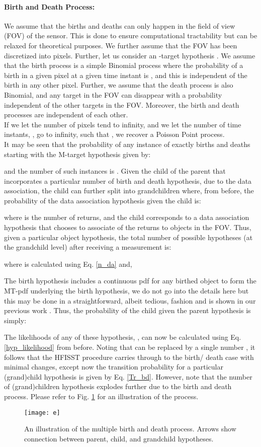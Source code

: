 \documentclass[10pt, conference]{IEEEtran}
\begin{document}
\paragraph{Birth and Death Process:} We assume that the births and deaths can only happen in the field of view (FOV) of the sensor. This is done to ensure computational tractability but can be relaxed for theoretical purposes. We further assume that the FOV has been discretized into  pixels. Further, let us consider an -target hypothesis . We assume that the birth process is a simple Binomial process where the probability of a birth in a given pixel at a given time instant is , and this is independent of the birth in any other pixel. Further, we  assume that the death process is also Binomial, and any target in the FOV can disappear with a probability  independent of the other targets in the FOV. Moreover, the birth and death processes are independent of each other. \\
If we let the number of pixels tend to infinity, and we let the number of time instants, , go to infinity, such that , we recover a Poisson Point process.\\
It may be seen that the probability of any instance of exactly  births and  deaths starting with the M-target hypothesis given by:

and the number of such instances is . Given the child  of the parent  that incorporates a particular number of birth and death hypothesis, due to the data association, the child  can further split into grandchildren  where, from before, the probability of the  data association hypothesis given the  child is:

where  is the number of returns, and the  child corresponds to a data association hypothesis that chooses to associate  of the returns to objects in the FOV. 
Thus, given a particular  object hypothesis, the total number of possible hypotheses (at the grandchild level) after receiving a measurement is:

where  is calculated using Eq. \ref{n_da} and,

The birth hypothesis includes a continuous pdf for any birthed object to form the MT-pdf underlying the birth hypothesis, we do not go into the details here but this may be done in a straightforward, albeit tedious, fashion and is shown in our previous work \cite{Faber1, Faber2}. Thus, the probability of the  child given the parent hypothesis  is simply:

The likelihoods of any of these hypothesis, , can now be calculated using Eq. \ref{hyp_likelihood} from before. Noting that  can be replaced by a single number , it follows that the HFISST procedure carries through to the birth/ death case with minimal changes, except now the transition probability for a particular (grand)child hypothesis is given by Eq. \ref{Tr_bd}. However, note that the number of (grand)children hypothesis explodes further due to the birth and death process. Please refer to Fig. \ref{tree} for an illustration of the process. 
\begin{figure}[h]
\centering
\texttt{[image: e]}
\caption{An illustration of the multiple birth and death process. Arrows show connection between parent, child, and grandchild hypotheses.}
\label{tree}
\end{figure}
\end{document}
